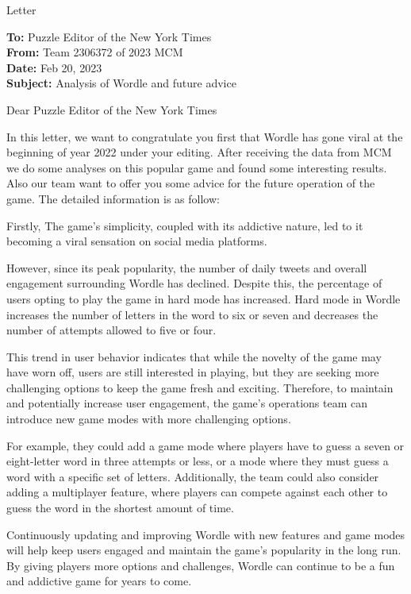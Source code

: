 \documentclass[12pt]{article}  %
\begin{document}
\begin{letter}{Letter}
	\begin{flushleft}  %
		\textbf{To:} Puzzle Editor of the New York Times\\
		\textbf{From:} Team 2306372 of 2023 MCM\\
		\textbf{Date:} Feb 20, 2023\\
		\textbf{Subject:} Analysis of Wordle and future advice 
	\end{flushleft}
	\headrule
	\begin{flushleft}
		Dear Puzzle Editor of the New York Times
	\end{flushleft}
	
	In this letter, we want to congratulate you first that Wordle has gone viral at the beginning of year 2022 under your editing. After receiving the data from MCM we do some analyses on this popular game and found some interesting results. Also our team want to offer you some advice for the future operation of the game. The detailed information is as follow:
	
	Firstly,  The game's simplicity, coupled with its addictive nature, led to it becoming a viral sensation on social media platforms.
	
	However, since its peak popularity, the number of daily tweets and overall engagement surrounding Wordle has declined. Despite this, the percentage of users opting to play the game in hard mode has increased. Hard mode in Wordle increases the number of letters in the word to six or seven and decreases the number of attempts allowed to five or four.
	
	This trend in user behavior indicates that while the novelty of the game may have worn off, users are still interested in playing, but they are seeking more challenging options to keep the game fresh and exciting. Therefore, to maintain and potentially increase user engagement, the game's operations team can introduce new game modes with more challenging options.
	
	For example, they could add a game mode where players have to guess a seven or eight-letter word in three attempts or less, or a mode where they must guess a word with a specific set of letters. Additionally, the team could also consider adding a multiplayer feature, where players can compete against each other to guess the word in the shortest amount of time.
	
	Continuously updating and improving Wordle with new features and game modes will help keep users engaged and maintain the game's popularity in the long run. By giving players more options and challenges, Wordle can continue to be a fun and addictive game for years to come.
	

\end{letter}
\end{document}
